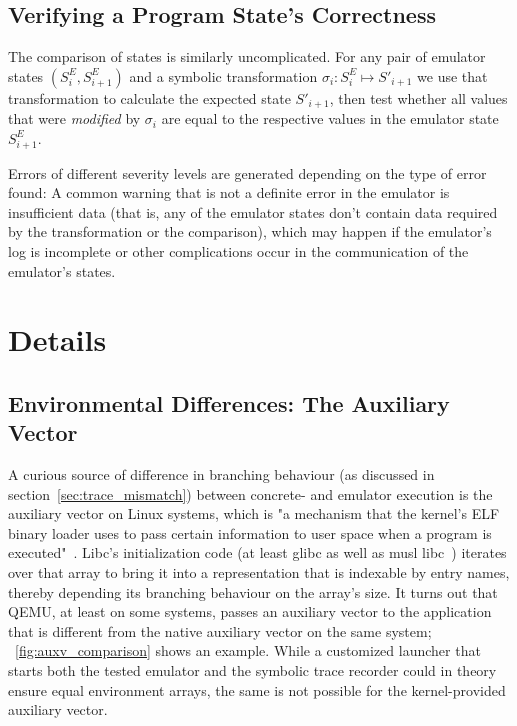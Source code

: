 \subsection{Verifying a Program State's Correctness}

The comparison of states is similarly uncomplicated. For any pair of emulator states $(S^E_i, S^E_{i+1})$ and a symbolic
transformation $\sigma_i : S^E_i \mapsto S'_{i+1}$ we use that transformation to calculate the expected state
$S'_{i+1}$, then test whether all values that were \textit{modified} by $\sigma_i$ are equal to the respective values in
the emulator state $S^E_{i+1}$.

Errors of different severity levels are generated depending on the type of error found: A common warning that is not a
definite error in the emulator is insufficient data (that is, any of the emulator states don't contain data required by
the transformation or the comparison), which may happen if the emulator's log is incomplete or other complications occur
in the communication of the emulator's states.

\section{Details}\label{sec:impl_details}

\subsection{Environmental Differences: The Auxiliary Vector}\label{sec:auxv}

A curious source of difference in branching behaviour (as discussed in section~\ref{sec:trace_mismatch}) between
concrete- and emulator execution is the auxiliary vector on Linux systems, which is "a mechanism that the kernel's ELF
binary loader uses to pass certain information to user space when a program is executed"~\cite{getauxval2024Mar}. Libc's
initialization code (at least glibc as well as musl libc~\cite{MuslLibc2024Feb}) iterates over that array to bring it
into a representation that is indexable by entry names, thereby depending its branching behaviour on the array's size.
It turns out that QEMU, at least on some systems, passes an auxiliary vector to the application that is different from
the native auxiliary vector on the same system; \figurename~\ref{fig:auxv_comparison} shows an example. While a
customized launcher that starts both the tested emulator and the symbolic trace recorder could in theory ensure equal
environment arrays, the same is not possible for the kernel-provided auxiliary vector.

